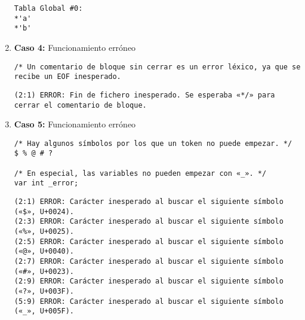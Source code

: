 \begin{enumerate}
    \begin{tcolorbox}[title={Volcado del fichero de la tabla de símbolos}, colback=white]
        \begin{lstlisting}
Tabla Global #0:
*'a'
*'b'
        \end{lstlisting}
    \end{tcolorbox}

    
    \item \textbf{Caso 4:} Funcionamiento erróneo
    \begin{tcolorbox}[title={Código fuente}, colback=white]
        \begin{lstlisting}
/* Un comentario de bloque sin cerrar es un error léxico, ya que se recibe un EOF inesperado.
        \end{lstlisting}      
    \end{tcolorbox}

    \begin{tcolorbox}[title={Errores detectados}, colback=white]
        \begin{lstlisting}
(2:1) ERROR: Fin de fichero inesperado. Se esperaba «*/» para cerrar el comentario de bloque.
        \end{lstlisting}
    \end{tcolorbox}


    \item \textbf{Caso 5:} Funcionamiento erróneo
    \begin{tcolorbox}[title={Código fuente}, colback=white]
        \begin{lstlisting}
/* Hay algunos símbolos por los que un token no puede empezar. */
$ % @ # ?

/* En especial, las variables no pueden empezar con «_». */
var int _error;
        \end{lstlisting}      
    \end{tcolorbox}

    \begin{tcolorbox}[title={Errores detectados}, colback=white]
        \begin{lstlisting}
(2:1) ERROR: Carácter inesperado al buscar el siguiente símbolo («$», U+0024).
(2:3) ERROR: Carácter inesperado al buscar el siguiente símbolo («%», U+0025).
(2:5) ERROR: Carácter inesperado al buscar el siguiente símbolo («@», U+0040).
(2:7) ERROR: Carácter inesperado al buscar el siguiente símbolo («#», U+0023).
(2:9) ERROR: Carácter inesperado al buscar el siguiente símbolo («?», U+003F).
(5:9) ERROR: Carácter inesperado al buscar el siguiente símbolo («_», U+005F).
        \end{lstlisting}
    \end{tcolorbox}


\end{enumerate}
